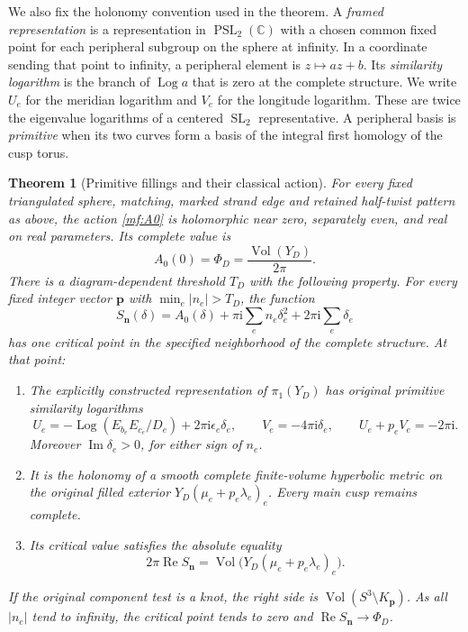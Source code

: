 \documentclass[11pt]{article}
\numberwithin{equation}{section}
\newtheorem{theorem}{Theorem}[section]
\theoremstyle{definition}
\theoremstyle{remark}
\newcommand{\ii}{\mathrm i}
\newcommand{\Rea}{\operatorname{Re}}
\newcommand{\Ima}{\operatorname{Im}}
\newcommand{\Vol}{\operatorname{Vol}}
\newcommand{\Log}{\operatorname{Log}}
\begin{document}
We also fix the holonomy convention used in the theorem. A
\emph{framed representation} is a representation in
\(\operatorname{PSL}_2(\mathbb C)\) with a chosen common fixed
point for each peripheral subgroup on the sphere at infinity. In a
coordinate sending that point to infinity, a peripheral element is
\(z\mapsto az+b\). Its \emph{similarity logarithm} is the branch
of \(\Log a\) that is zero at the complete structure. We write
\(U_e\) for the meridian logarithm and \(V_e\) for the longitude
logarithm. These are twice the eigenvalue logarithms of a centered
\(\operatorname{SL}_2\) representative. A peripheral basis is
\emph{primitive} when its two curves form a basis of the integral
first homology of the cusp torus.

\begin{theorem}[Primitive fillings and their classical action]
\label{mf:main}
For every fixed triangulated sphere, matching, marked strand edge and
retained half-twist pattern as above,
the action \eqref{mf:A0} is holomorphic near zero, separately even,
and real on real parameters. Its complete value is
\[
             A_0(0)=\Phi_D=\frac{\Vol(Y_D)}{2\pi}.
\]
There is a diagram-dependent threshold \(T_D\) with the following
property. For every fixed integer vector \(\mathbf p\) with
\(\min_e|n_e|>T_D\), the function
\begin{equation}\label{mf:filling-action}
 S_{\mathbf n}(\delta)=A_0(\delta)+
       \pi\ii\sum_e n_e\delta_e^2+2\pi\ii\sum_e\delta_e
\end{equation}
has one critical point in the specified neighborhood of the complete structure. At that point:
\begin{enumerate}[label=(\roman*)]
\item The explicitly constructed representation of \(\pi_1(Y_D)\)
has original primitive similarity logarithms
\begin{equation}\label{mf:logs}
 U_e=-\Log(E_{b_e}E_{c_e}/D_e)+2\pi\ii\epsilon_e\delta_e,
 \qquad V_e=-4\pi\ii\delta_e,\qquad
 U_e+p_eV_e=-2\pi\ii .
\end{equation}
Moreover \(\Ima\delta_e>0\), for either sign of \(n_e\).
\item It is the holonomy of a smooth complete finite-volume hyperbolic
metric on the original filled exterior
\(Y_D(\mu_e+p_e\lambda_e)_e\). Every main cusp remains complete.
\item Its critical value satisfies the absolute equality
\begin{equation}\label{mf:volume}
 2\pi\Rea S_{\mathbf n}
       =\Vol\bigl(Y_D(\mu_e+p_e\lambda_e)_e\bigr).
\end{equation}
\end{enumerate}
If the original component test is a knot, the right side is
\(\Vol(S^3\setminus K_{\mathbf p})\).
As all \(|n_e|\) tend to infinity, the critical point tends to zero
and \(\Rea S_{\mathbf n}\to\Phi_D\).
\end{theorem}
\end{document}
